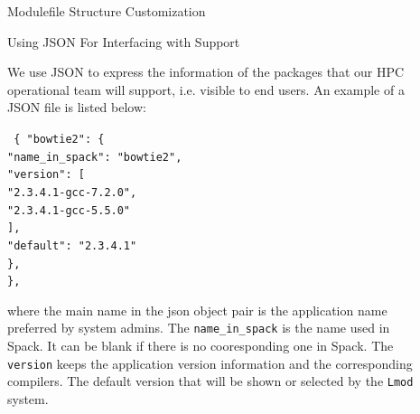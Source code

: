 \documentclass[final]{beamer}
\newlength{\sepwid}
\newlength{\onecolwid}
\begin{document}
\begin{frame}[t]
\begin{columns}[t]
\begin{column}{\onecolwid}
\begin{block}{Modulefile Structure Customization}
\end{block}



\vspace{-1em}
\begin{block}{Using JSON For Interfacing with Support}

We use JSON to express the information of the packages that our HPC operational team will support, i.e. visible to end users. An example of a JSON file is listed below:

\texttt{
\{  "bowtie2": \{ \\
\qquad \qquad         "name\_in\_spack": "bowtie2", \\
\qquad \qquad         "version": [ \\
\qquad \qquad \qquad             "2.3.4.1-gcc-7.2.0",\\
\qquad \qquad \qquad             "2.3.4.1-gcc-5.5.0" \\
\qquad \qquad         ], \\
\qquad \qquad         "default": "2.3.4.1" \\
\qquad     \}, \\
\}, \\
}

where the main name in the json object pair is the application name preferred by system admins. The \texttt{name\_in\_spack} is the name used in Spack. It can be blank if there is no cooresponding one in Spack. The \texttt{version} keeps the application version information and the corresponding compilers. The default version that will be shown or selected by the \texttt{Lmod} system.

\end{block}

\end{column} %


\begin{column}{\sepwid}\end{column} %

\begin{column}{\onecolwid} %



\end{column}
\end{columns}
\end{frame}
\end{document}
